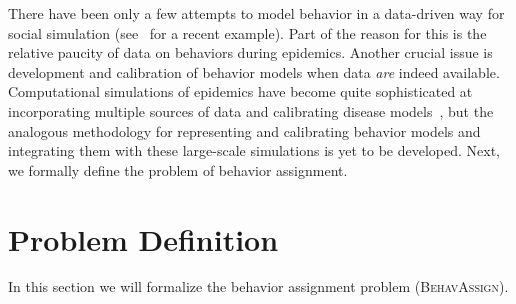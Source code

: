 \documentclass[doublespace]{VTthesis}
\begin{document}
    There have been only a few attempts to model behavior in a data-driven way for social simulation (see~\cite{pynadath16behavior} for a recent example). Part of the reason for this is the relative paucity of data on behaviors during epidemics. Another crucial issue is development and calibration of behavior models when data \emph{are} indeed available. Computational simulations of epidemics have become quite sophisticated at incorporating multiple sources of data and calibrating disease models~\cite{EG+04}, but the analogous methodology for representing and calibrating behavior models and integrating them with these large-scale simulations is yet to be developed. Next, we formally define the problem of behavior assignment.
    
    \section{Problem Definition}
    In this section we will formalize the behavior assignment problem (\textsc{BehavAssign}).
    
\end{document}
